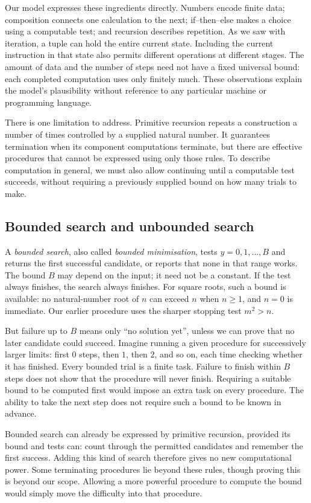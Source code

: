 Our model expresses these ingredients directly. Numbers encode finite data;
composition connects one calculation to the next; if--then--else makes a
choice using a computable test; and recursion describes repetition. As we
saw with iteration, a tuple can hold the entire current state. Including the
current instruction in that state also permits different operations at
different stages. The amount of data and the number of steps need not have
a fixed universal bound: each completed computation uses only finitely much.
These observations explain the model's plausibility without reference to
any particular machine or programming language.

There is one limitation to address. Primitive recursion repeats a
construction a number of times controlled by a supplied natural number.
It guarantees termination when its component computations terminate, but
there are effective procedures that cannot be expressed using only those
rules. To describe computation in general, we must also allow continuing
until a computable test succeeds, without requiring a previously supplied
bound on how many trials to make.

\subsection{Bounded search and unbounded search}

A \emph{bounded search}, also called \emph{bounded minimisation}, tests
$y=0,1,\ldots,B$ and returns the first successful candidate, or reports that
none in that range works. The bound $B$ may depend on the input; it need not
be a constant. If the test always finishes, the search always finishes.
For square roots, such a bound is available: no natural-number root of $n$
can exceed $n$ when $n\geq1$, and $n=0$ is immediate. Our earlier procedure
uses the sharper stopping test $m^2>n$.

But failure up to $B$ means only ``no solution yet'', unless we can prove
that no later candidate could succeed. Imagine running a given procedure
for successively larger limits: first $0$ steps, then $1$, then $2$, and so
on, each time checking whether it has finished. Every bounded trial is a
finite task. Failure to finish within $B$ steps does not show that the
procedure will never finish.
Requiring a suitable bound to be computed first would impose an extra task
on every procedure. The ability to take the next step does not require such
a bound to be known in advance.

Bounded search can already be expressed by primitive recursion, provided
its bound and tests can: count through the permitted candidates and remember
the first success. Adding this kind of search therefore gives no new
computational power. Some terminating procedures lie beyond these rules,
though proving this is beyond our scope. Allowing a more powerful procedure
to compute the bound would simply move the difficulty into that procedure.

